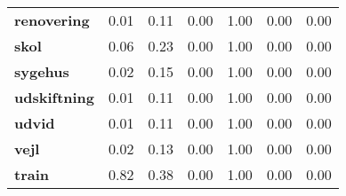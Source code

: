\begin{landscape}
\begin{longtable}{lllllll}
\textbf{renovering} & 0.01 & 0.11 & 0.00 & 1.00 & 0.00 & 0.00 \\
\textbf{skol} & 0.06 & 0.23 & 0.00 & 1.00 & 0.00 & 0.00 \\
\textbf{sygehus} & 0.02 & 0.15 & 0.00 & 1.00 & 0.00 & 0.00 \\
\textbf{udskiftning} & 0.01 & 0.11 & 0.00 & 1.00 & 0.00 & 0.00 \\
\textbf{udvid} & 0.01 & 0.11 & 0.00 & 1.00 & 0.00 & 0.00 \\
\textbf{vejl} & 0.02 & 0.13 & 0.00 & 1.00 & 0.00 & 0.00 \\
\textbf{train} & 0.82 & 0.38 & 0.00 & 1.00 & 0.00 & 0.00 \\
\end{longtable}\end{landscape}
